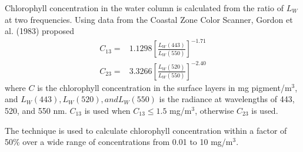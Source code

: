 Chlorophyll concentration in the water column is calculated from the ratio of
$L_W$ at two frequencies. Using data from the Coastal Zone Color
Scanner, Gordon et al. (1983) proposed
\begin{subequations}
\begin{align}
C_{13} = & 1.1298 \left[ \frac{L_W(443)}{L_W(550)}\right]^{-1.71}\\
C_{23} = & 3.3266 \left[ \frac{L_W(520)}{L_W(550)}\right]^{-2.40}
\end{align}
\end{subequations}
where $C$ is the chlorophyll concentration in the surface layers in mg
pigment/m$^3$, and $L_W(443), L_W(520), and L_W(550)$ is the radiance at
wavelengths of 443, 520, and 550 nm.
$C_{13}$ is used when $C_{13} \le 1.5$ mg/m$^3$, otherwise $C_{23}$ is used.

The technique is used to calculate chlorophyll concentration within a factor of
50\% over a wide range of concentrations from 0.01 to 10 mg/m$^3$.

